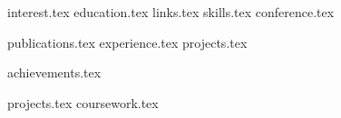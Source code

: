 \documentclass[]{deedy-resume-openfont}
\newcommand*{\pgonecolone}{pg_1_column_1/}
\newcommand*{\pgonecoltwo}{pg_1_column_2/}
\newcommand*{\pgtwocolone}{pg_2_column_1/}
\newcommand*{\pgtwocoltwo}{pg_2_column_2/}
\begin{document}
%
%


%
%



%
%

\begin{minipage}[t]{0.33\textwidth} 

{interest.tex}
{education.tex}
{links.tex}
{skills.tex}
{conference.tex}


%
%

\end{minipage} 
\hfill
\begin{minipage}[t]{0.65\textwidth} 

{publications.tex}
{experience.tex}
{projects.tex}

\end{minipage} 


%
%

\begin{minipage}[t]{0.33\textwidth} 

{achievements.tex}


%
%

\end{minipage} 
\hfill
\begin{minipage}[t]{0.65\textwidth} 

{projects.tex}
{coursework.tex}

\end{minipage} 
\end{document}
